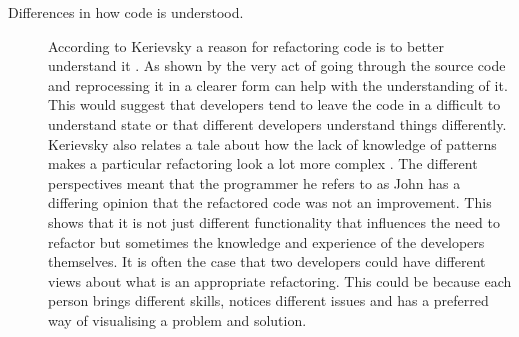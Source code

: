 \begin{description}

\item [Differences in how code is understood.]    
According to  Kerievsky a reason for refactoring code is to better understand it \cite{Kerievsky2004}. 
As shown by \cite{Bois2005} the very act of going through the source code and reprocessing it in a clearer form can help with the understanding of it. 
This would suggest that developers tend to leave the code in a difficult to understand state or that different developers understand things differently.
Kerievsky also relates a tale about how the lack of knowledge of patterns makes a particular refactoring look a lot more complex \cite{Kerievsky2004}. 
The different perspectives meant that the programmer he refers to as John has a differing opinion that the refactored code was not an improvement. 
This shows that it is not just different functionality that influences the need to refactor but sometimes the knowledge and experience of the developers themselves. 
It is often the case that two developers could have different views about what is an appropriate refactoring. 
This could be because each person brings different skills, notices different issues and has a preferred way of visualising a problem and solution.

\end{description}
